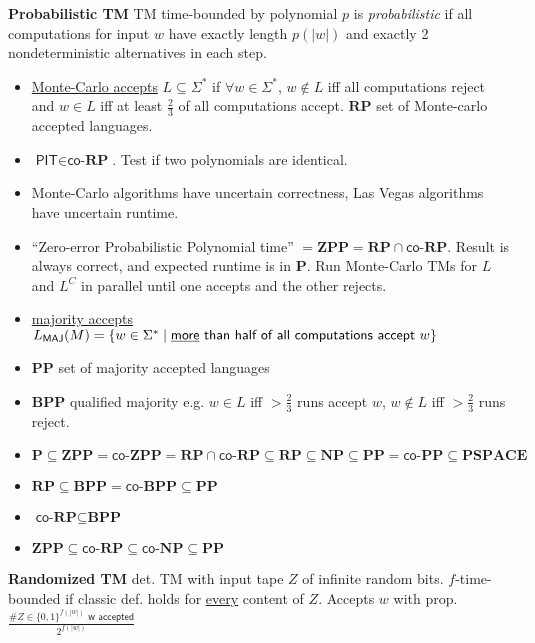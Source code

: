 \documentclass[10pt, twocolumn, parskip=never]{scrartcl}
\newcommand{\fat}[1]{\textbf{#1}}
\newcommand{\newthing}[1]{\fat{\faicon{caret-right} #1}}
\begin{document}
\newthing{Probabilistic TM} TM time-bounded by polynomial $p$ is \emph{probabilistic} if all computations for input $w$ have exactly length $p(|w|)$ and exactly 2 nondeterministic alternatives in each step.
\vspace{-0.5em}
\begin{itemize}
  \item \underline{Monte-Carlo accepts} $L \subseteq \Sigma^*$ if $\forall w \in \Sigma^*$, $w \not \in L$ iff all computations reject and $w \in L$ iff at least $\frac{2}{3}$ of all computations accept. $\fat{RP}$ set of Monte-carlo accepted languages.
  \item $\textsf{PIT} \in \textsf{co-}\fat{RP}$. Test if two polynomials are identical.
  \item Monte-Carlo algorithms have uncertain correctness, Las Vegas algorithms have uncertain runtime.
  \item \enquote{Zero-error Probabilistic Polynomial time} $ = \fat{ZPP} = \fat{RP} \cap \textsf{co-}\fat{RP}$. Result is always correct, and expected runtime is in \fat{P}. Run Monte-Carlo TMs for $L$ and $L^C$ in parallel until one accepts and the other rejects.
  \item \underline{majority accepts} $L_{\textsf{MAJ}}(M) = \{ w \in \Sigma^* \mid \textsf{\underline{more} than half of all computations accept } w \}$
  \item $\fat{PP}$ set of majority accepted languages
  \item $\fat{BPP}$ qualified majority e.g. $w \in L$ iff $>\frac{2}{3}$ runs accept $w$, $w \notin L$ iff $>\frac{2}{3}$ runs reject.
  \item $\fat{P} \subseteq \fat{ZPP} = \textsf{co-}\fat{ZPP} = \fat{RP} \cap \textsf{co-}\fat{RP} \subseteq \fat{RP} \subseteq \fat{NP} \subseteq \fat{PP} = \textsf{co-}\fat{PP} \subseteq \fat{PSPACE}$
  \item $\fat{RP} \subseteq \fat{BPP} = \textsf{co-}\fat{BPP} \subseteq \fat{PP}$
  \item $\textsf{co-}\fat{RP} \subseteq \fat{BPP}$
  \item $\fat{ZPP} \subseteq \textsf{co-}\fat{RP} \subseteq \textsf{co-}\fat{NP} \subseteq \fat{PP}$
\end{itemize}

\newthing{Randomized TM} det. TM with input tape $Z$ of infinite random bits. $f$-time-bounded if classic def. holds for \underline{every} content of $Z$. Accepts $w$ with prop. $\frac{\#Z \in \{0,1\}^{f(|w|)} \textsf{ w accepted}}{2^{f(|w|)}}$
\end{document}
